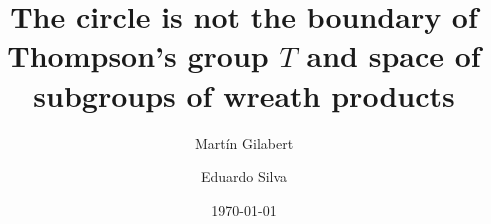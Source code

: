 \documentclass[reqno,oneside,11pt]{amsart}
\author{Martín Gilabert}
\author{Eduardo Silva}
\title[The circle is not the boundary of Thompson's group $T$ and space of subgroups of wreath products]{The circle is not the boundary of Thompson's group $T$ and space of subgroups of wreath products}
\date{\today}
\begin{document}
	
	\maketitle
	\begin{abstract}
	\end{abstract}
	
	
	
	
	
	
\end{document}

